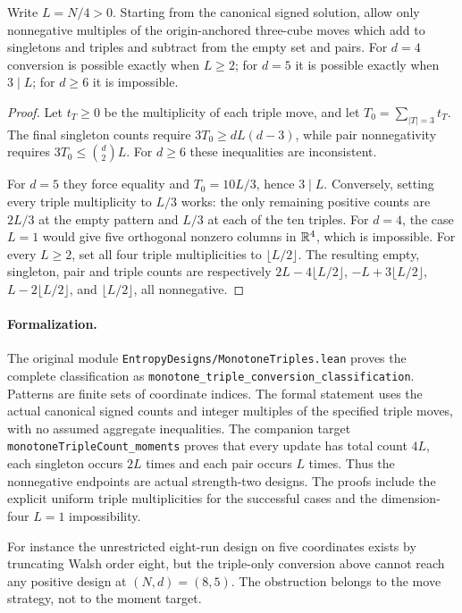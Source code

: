 \begin{proposition}
Write $L=N/4>0$. Starting from the canonical signed solution, allow only
nonnegative multiples of the origin-anchored three-cube moves which add
to singletons and triples and subtract from the empty set and pairs.
For $d=4$ conversion is possible exactly when $L\ge2$; for $d=5$ it is
possible exactly when $3\mid L$; for $d\ge6$ it is impossible.
\end{proposition}
\begin{proof}
Let $t_T\ge0$ be the multiplicity of each triple move, and let
$T_0=\sum_{|T|=3}t_T$. The final singleton counts require
$3T_0\ge dL(d-3)$, while pair nonnegativity requires
$3T_0\le\binom d2L$. For $d\ge6$ these inequalities are inconsistent.

For $d=5$ they force equality and $T_0=10L/3$, hence $3\mid L$.
Conversely, setting every triple multiplicity to $L/3$ works: the only
remaining positive counts are $2L/3$ at the empty pattern and $L/3$
at each of the ten triples. For $d=4$, the case $L=1$ would give five
orthogonal nonzero columns in $\mathbb R^4$, which is impossible. For every
$L\ge2$, set all four triple multiplicities to $\lfloor L/2\rfloor$.
The resulting empty, singleton, pair and triple counts are respectively
$2L-4\lfloor L/2\rfloor$, $-L+3\lfloor L/2\rfloor$,
$L-2\lfloor L/2\rfloor$, and $\lfloor L/2\rfloor$, all nonnegative.
\end{proof}
\paragraph{Formalization.}
The original module
\texttt{EntropyDesigns/\allowbreak MonotoneTriples.lean}
proves the complete classification as
\texttt{monotone\_\allowbreak triple\_\allowbreak conversion\_\allowbreak classification}.
Patterns are finite sets of coordinate indices. The formal statement
uses the actual canonical signed counts and integer multiples of the
specified triple moves, with no assumed aggregate inequalities.
The companion target
\texttt{monotoneTripleCount\_\allowbreak moments}
proves that every update has total count $4L$, each singleton
occurs $2L$ times and each pair occurs $L$ times. Thus the
nonnegative endpoints are actual strength-two designs. The proofs
include the explicit uniform triple multiplicities for the successful
cases and the dimension-four $L=1$ impossibility.

For instance the unrestricted eight-run design on five coordinates
exists by truncating Walsh order eight, but the triple-only conversion
above cannot reach any positive design at $(N,d)=(8,5)$. The obstruction
belongs to the move strategy, not to the moment target.


